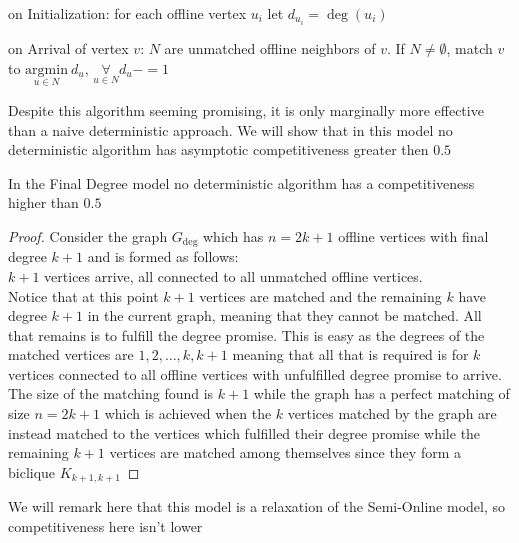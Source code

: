 \begin{algorithm}
	\caption{Effective Degree}
	\label{alg:effective-deg}
	\begin{algorithmic}
		\item on Initialization: for each offline vertex $u_i$ let $d_{u_i}=\deg(u_i)$
		\item on Arrival of vertex $v$: $N$ are unmatched offline neighbors of $v$. If $N\neq\emptyset$, match $v$ to $\underset{u\in N}{\mathrm{argmin}}\ d_u$, $\underset{u\in N}{\forall}d_u-=1$
	\end{algorithmic}
\end{algorithm}
Despite this algorithm seeming promising, it is only marginally more effective than a naive deterministic approach. We will show that in this model no deterministic algorithm has asymptotic competitiveness greater then $0.5$
\begin{theorem}
	\label{thm:deg-det-comp}
	In the Final Degree model no deterministic algorithm has a competitiveness higher than $0.5$
\end{theorem}
\begin{proof}
	Consider the graph $G_{\deg}$ which has $n=2k+1$ offline vertices with final degree $k+1$ and is formed as follows:\\
	$k+1$ vertices arrive, all connected to all unmatched offline vertices.\\
	Notice that at this point $k+1$ vertices are matched and the remaining $k$ have degree $k+1$ in the current graph, meaning that they cannot be matched. All that remains is to fulfill the degree promise. This is easy as the degrees of the matched vertices are $1,2,\dots,k,k+1$ meaning that all that is required is for $k$ vertices connected to all offline vertices with unfulfilled degree promise to arrive.\\
	The size of the matching found is $k+1$ while the graph has a perfect matching of size $n=2k+1$ which is achieved when the $k$ vertices matched by the graph are instead matched to the vertices which fulfilled their degree promise while the remaining $k+1$ vertices are matched among themselves since they form a biclique $K_{k+1,k+1}$
\end{proof}
\begin{figure}[H]
	\label{fig:deg-det-comp}
	\centering
	\scalebox{.8}{}
\end{figure}
We will remark here that this model is a relaxation of the Semi-Online model, so competitiveness here isn't lower\\

